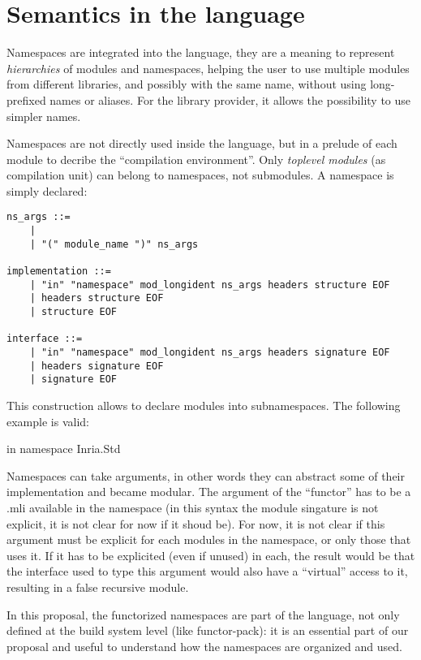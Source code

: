 \documentclass[11pt,a4paper]{article}
\begin{document}
\section{Semantics in the language}

Namespaces are integrated into the language, they are a meaning to represent
\emph{hierarchies} of modules and namespaces, helping the user to use multiple
modules from different libraries, and possibly with the same name, without using
long-prefixed names or aliases. For the library provider, it allows the
possibility to use simpler names.

Namespaces are not directly used inside the language, but in a prelude of each
module to decribe the ``compilation environment''. Only \emph{toplevel modules}
(as compilation unit) can belong to namespaces, not submodules. A namespace is
simply declared: 

\begin{verbatim}
ns_args ::=
    | 
    | "(" module_name ")" ns_args

implementation ::=
    | "in" "namespace" mod_longident ns_args headers structure EOF
    | headers structure EOF
    | structure EOF

interface ::=
    | "in" "namespace" mod_longident ns_args headers signature EOF
    | headers signature EOF
    | signature EOF
\end{verbatim}

This construction allows to declare modules into subnamespaces. The following
example is valid:

\begin{OCaml}
in namespace Inria.Std
\end{OCaml}

Namespaces can take arguments, in other words they can abstract some of their
implementation and became modular. The argument of the ``functor'' has to be a
.mli available in the namespace (in this syntax the module singature is not
explicit, it is not clear for now if it shoud be). For now, it is not clear if
this argument must be explicit for each modules in the namespace, or only those
that uses it. If it has to be explicited (even if unused) in each, the result
would be that the interface used to type this argument would also have a
``virtual'' access to it, resulting in a false recursive module.

In this proposal, the functorized namespaces are part of the language, not only
defined at the build system level (like functor-pack): it is an essential part
of our proposal and useful to understand how the namespaces are organized and
used.
\end{document}
